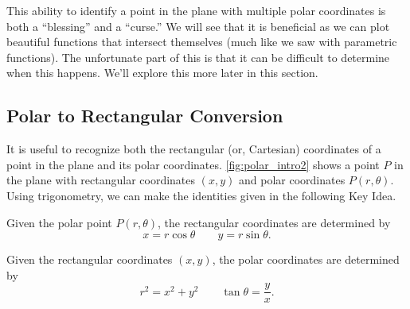 This ability to identify a point in the plane with multiple polar coordinates is both a ``blessing'' and a ``curse.'' We will see that it is beneficial as we can plot beautiful functions that intersect themselves (much like we saw with parametric functions). The unfortunate part of this is that it can be difficult to determine when this happens. We'll explore this more later in this section.

\subsection*{Polar to Rectangular Conversion}


It is useful to recognize both the rectangular (or, Cartesian) coordinates of a point in the plane and its polar coordinates. \autoref{fig:polar_intro2} shows a point $P$ in the plane with rectangular coordinates $(x,y)$ and polar coordinates $P(r,\theta)$. Using trigonometry, we can make the identities given in the following Key Idea.

{Given the polar point $P(r,\theta)$, the rectangular coordinates are determined by $$x=r\cos \theta\qquad y=r\sin \theta.$$

Given the rectangular coordinates $(x,y)$, the polar coordinates are determined by
$$ r^2=x^2+y^2\qquad \tan \theta = \frac yx.$$
}

